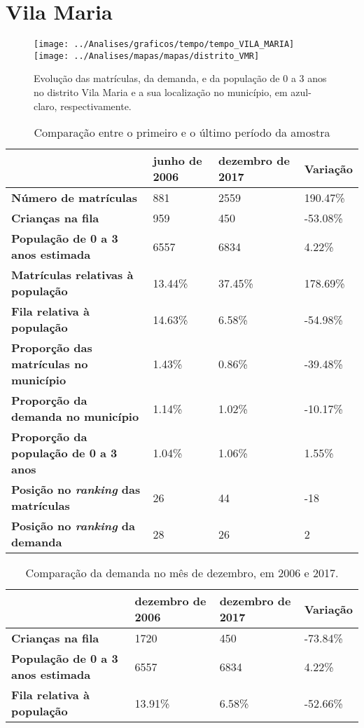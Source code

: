 \section{Vila Maria}
\begin{figure}[H]
\centering
\texttt{[image: ../Analises/graficos/tempo/tempo\_VILA\_MARIA]}
\texttt{[image: ../Analises/mapas/mapas/distrito\_VMR]}
\caption{Evolução das matrículas, da demanda, e da população de 0 a 3 anos no distrito Vila Maria e a sua localização no município, em azul-claro, respectivamente.}
\end{figure}
\begin{table}[H]
\begin{tabular}{l|l|l|l}
\textbf{}                                      & \textbf{junho de 2006}       & \textbf{dezembro de 2017}    & \textbf{Variação} \\ \hline
\textbf{Número de matrículas}                  & 881 & 2559 & 190.47\% \\ \hline
\textbf{Crianças na fila}                      & 959 & 450 & -53.08\% \\ \hline
\textbf{População de 0 a 3 anos estimada}      & 6557 & 6834 & 4.22\% \\ \hline
\textbf{Matrículas relativas à população}      & 13.44\% & 37.45\% & 178.69\% \\ \hline
\textbf{Fila relativa à população}             & 14.63\% & 6.58\% & -54.98\% \\ \hline
\textbf{Proporção das matrículas no município} & 1.43\% & 0.86\% & -39.48\% \\ \hline
\textbf{Proporção da demanda no município}     & 1.14\% & 1.02\% & -10.17\% \\ \hline
\textbf{Proporção da população de 0 a 3 anos}  & 1.04\% & 1.06\% & 1.55\% \\ \hline
\textbf{Posição no \textit{ranking} das matrículas}     & 26 & 44 & -18 \\ \hline
\textbf{Posição no \textit{ranking} da demanda}         & 28 & 26 & 2 \\ 
\end{tabular}
\caption{Comparação entre o primeiro e o último período da amostra}
\end{table}
\begin{table}[H]
\begin{tabular}{l|l|l|l}
\textbf{}                                 & \textbf{dezembro de 2006} & \textbf{dezembro de 2017} & \textbf{Variação} \\ \hline
\textbf{Crianças na fila}                      & 1720 & 450 & -73.84\% \\ \hline
\textbf{População de 0 a 3 anos estimada}      & 6557 & 6834 & 4.22\% \\ \hline
\textbf{Fila relativa à população}             & 13.91\% & 6.58\% & -52.66\% \\
\end{tabular}
\caption{Comparação da demanda no mês de dezembro, em 2006 e 2017.}
\end{table}
